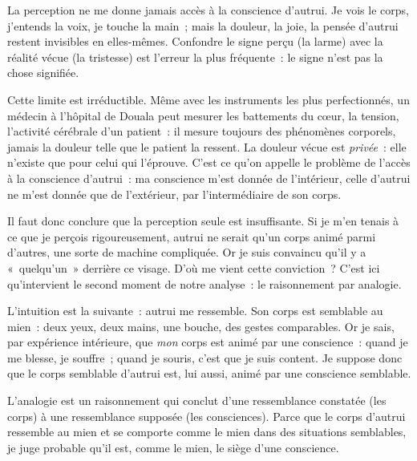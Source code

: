 \documentclass[11pt]{article}
\newcommand{\cle}[1]{{\popxbold\color{popdark}#1}}
\newcounter{popsec}
\newcounter{popsub}
\newcommand{\courssub}[1]{%
  \stepcounter{popsub}%
  \par\vspace{9pt}\noindent{\popxbold\fontsize{11.5}{13}\selectfont\color{popink}{\color{poporange}\thepopsec.\thepopsub}\hspace{6pt}#1}\par\nopagebreak\vspace{4pt}
}
\begin{document}
\begin{attention}
La perception ne me donne jamais accès à la conscience d'autrui. Je vois le corps, j'entends la voix, je touche la main~; mais la douleur, la joie, la pensée d'autrui restent invisibles en elles-mêmes. Confondre le signe perçu (la larme) avec la réalité vécue (la tristesse) est l'erreur la plus fréquente~: le signe n'est pas la chose signifiée.
\end{attention}

Cette limite est irréductible. Même avec les instruments les plus perfectionnés, un médecin à l'hôpital de Douala peut mesurer les battements du cœur, la tension, l'activité cérébrale d'un patient~: il mesure toujours des phénomènes corporels, jamais la douleur telle que le patient la ressent. La douleur vécue est \emph{privée}~: elle n'existe que pour celui qui l'éprouve. C'est ce qu'on appelle le problème de l'accès à la conscience d'autrui~: ma conscience m'est donnée de l'intérieur, celle d'autrui ne m'est donnée que de l'extérieur, par l'intermédiaire de son corps.

Il faut donc conclure que la perception seule est insuffisante. Si je m'en tenais à ce que je perçois rigoureusement, autrui ne serait qu'un corps animé parmi d'autres, une sorte de machine compliquée. Or je suis convaincu qu'il y a «~quelqu'un~» derrière ce visage. D'où me vient cette conviction~? C'est ici qu'intervient le second moment de notre analyse~: le raisonnement par analogie.

\courssub{Le raisonnement par analogie}

L'intuition est la suivante~: autrui me ressemble. Son corps est semblable au mien~: deux yeux, deux mains, une bouche, des gestes comparables. Or je sais, par expérience intérieure, que \emph{mon} corps est animé par une conscience~: quand je me blesse, je souffre~; quand je souris, c'est que je suis content. Je suppose donc que le corps semblable d'autrui est, lui aussi, animé par une conscience semblable.

\begin{definition}[L'analogie]
L'\cle{analogie} est un raisonnement qui conclut d'une ressemblance constatée (les corps) à une ressemblance supposée (les consciences). Parce que le corps d'autrui ressemble au mien et se comporte comme le mien dans des situations semblables, je juge probable qu'il est, comme le mien, le siège d'une conscience.
\end{definition}
\end{document}
